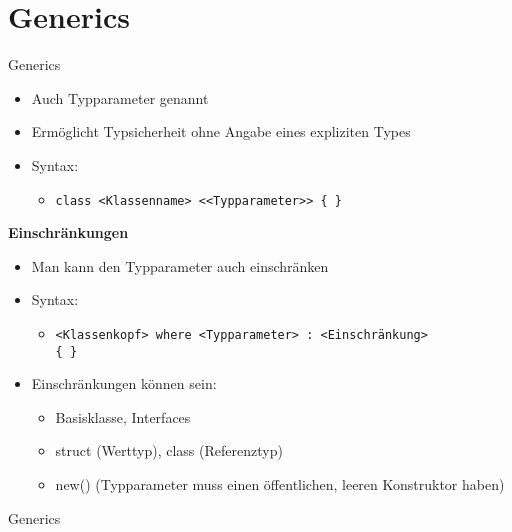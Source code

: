 \section{Generics}
\begin{frame}{Generics}
	\begin{itemize}
		\item Auch Typparameter genannt
		\item Ermöglicht Typsicherheit ohne Angabe eines expliziten Types
		\item Syntax:
		\begin{itemize}
			\item \texttt{class \alert{<Klassenname>} <\alert{<Typparameter>}> \{ \}}
		\end{itemize}
	\end{itemize}
	\textbf{Einschränkungen}\\
	\begin{itemize}
		\item Man kann den Typparameter auch einschränken
		\item Syntax:
		\begin{itemize}
			\item \texttt{\alert{<Klassenkopf>} where \alert{<Typparameter>} : \alert{<Einschränkung>}\\ \{ \}}
		\end{itemize}
		\item Einschränkungen können sein:
		\begin{itemize}
			\item Basisklasse, Interfaces
			\item \alert{struct} (Werttyp), \alert{class} (Referenztyp)
			\item \alert{new()} (Typparameter muss einen öffentlichen, leeren Konstruktor haben)
		\end{itemize}
	\end{itemize}
\end{frame}

\begin{frame}{Generics}
	
	
\end{frame}

